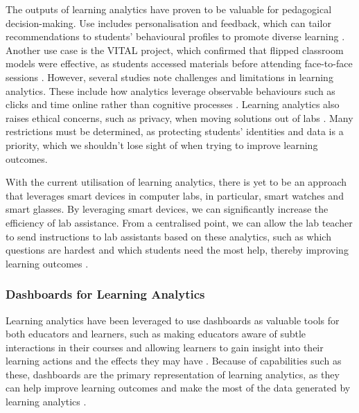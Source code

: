 The outputs of learning analytics have proven to be valuable for pedagogical decision-making. 
Use includes personalisation and feedback, which can tailor recommendations to students' behavioural profiles to promote diverse learning \cite{vieira_2018_visual}. 
Another use case is the VITAL project, which confirmed that flipped classroom models were effective, as students accessed materials before attending face-to-face sessions \cite{gelan_2018_affordances}. 
However, several studies note challenges and limitations in learning analytics. 
These include how analytics leverage observable behaviours such as clicks and time online rather than cognitive processes \cite{wilson_2017_learning}. 
Learning analytics also raises ethical concerns, such as privacy, when moving solutions out of labs \cite{wilson_2017_learning,tzimas_2021_ethical}. 
Many restrictions must be determined, as protecting students' identities and data is a priority, which we shouldn't lose sight of when trying to improve learning outcomes.


With the current utilisation of learning analytics, there is yet to be an approach that leverages smart devices in computer labs, in particular, smart watches and smart glasses.
By leveraging smart devices, we can significantly increase the efficiency of lab assistance. 
From a centralised point, we can allow the lab teacher to send instructions to lab assistants based on these analytics, such as which questions are hardest and which students need the most help, thereby improving learning outcomes \cite{vieira_2018_visual,wilson_2017_learning,tzimas_2021_ethical}.

\subsubsection{Dashboards for Learning Analytics}

Learning analytics have been leveraged to use dashboards as valuable tools for both educators and learners, such as making educators aware of subtle interactions in their courses and allowing learners to gain insight into their learning actions and the effects they may have \cite{klerkx_2017_learning,verbert_2013_learning}. Because of capabilities such as these, dashboards are the primary representation of learning analytics, as they can help improve learning outcomes and make the most of the data generated by learning analytics \cite{klerkx_2017_learning,verbert_2013_learning}.

